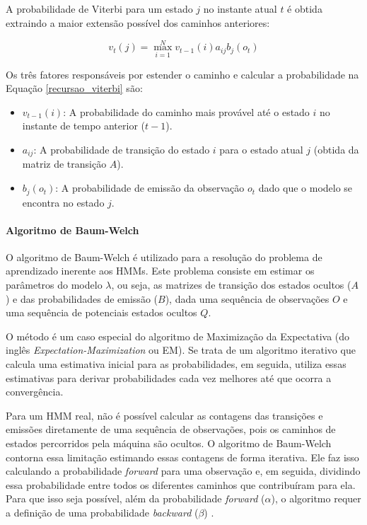 \documentclass[
    12pt,                %
    openright,           %
    oneside,             %
    a4paper,             %
    english,             %
    brazil               %
]{abntex2}
\begin{document}
A probabilidade de Viterbi para um estado $j$ no instante atual $t$ é obtida extraindo a maior extensão possível dos caminhos anteriores: \cite{jm3}

\begin{equation}
    v_t(j) = \max_{i=1}^{N} v_{t-1}(i) a_{ij} b_j(o_t)
    \label{recursao_viterbi}
\end{equation}

Os três fatores responsáveis por estender o caminho e calcular a probabilidade na Equação \ref{recursao_viterbi} são:

\begin{itemize}
    \item $v_{t-1}(i)$: A probabilidade do caminho mais provável até o estado $i$ no instante de tempo anterior ($t-1$).
    \item $a_{ij}$: A probabilidade de transição do estado $i$ para o estado atual $j$ (obtida da matriz de transição $A$).
    \item $b_j(o_t)$: A probabilidade de emissão da observação $o_t$ dado que o modelo se encontra no estado $j$.
\end{itemize}

\paragraph{Algoritmo de Baum-Welch}

O algoritmo de Baum-Welch é utilizado para a resolução do problema de aprendizado inerente aos HMMs.
Este problema consiste em estimar os parâmetros do modelo $\lambda$, ou seja, as matrizes de transição dos estados ocultos ($A$) e das probabilidades
de emissão ($B$), dada uma sequência de observações $O$ e uma sequência de potenciais estados ocultos $Q$.

O método é um caso especial do algoritmo de Maximização da Expectativa (do inglês \textit{Expectation-Maximization} ou EM). Se trata de um algoritmo 
iterativo que calcula uma estimativa inicial para as probabilidades, em seguida, utiliza essas estimativas para derivar probabilidades cada vez 
melhores até que ocorra a convergência. 

Para um HMM real, não é possível calcular as contagens das transições e emissões diretamente de uma sequência de observações, pois os caminhos de estados percorridos 
pela máquina são ocultos. O algoritmo de Baum-Welch contorna essa limitação estimando essas contagens de forma iterativa. 
Ele faz isso calculando a probabilidade \textit{forward} para uma observação e, em seguida, dividindo essa probabilidade entre todos os diferentes 
caminhos que contribuíram para ela. Para que isso seja possível, além da probabilidade \textit{forward} ($\alpha$), o algoritmo 
requer a definição de uma probabilidade \textit{backward} ($\beta$) \cite{jm3}.
\end{document}
